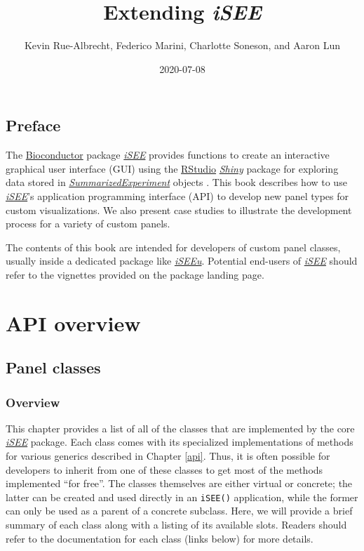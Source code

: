 \documentclass[
]{book}
\title{Extending \emph{iSEE}}
\author{Kevin Rue-Albrecht, Federico Marini, Charlotte Soneson, and Aaron Lun}
\date{2020-07-08}
\begin{document}
\maketitle

{
\setcounter{tocdepth}{1}
\tableofcontents
}
\hypertarget{preface}{%
\chapter*{Preface}\label{preface}}

The \href{https://bioconductor.org/}{Bioconductor} package \emph{\href{https://bioconductor.org/packages/3.11/iSEE}{iSEE}} provides functions to create an interactive graphical user interface (GUI) using the \href{https://rstudio.com/}{RStudio} \emph{\href{https://CRAN.R-project.org/package=Shiny}{Shiny}} package for exploring data stored in \emph{\href{https://bioconductor.org/packages/3.11/SummarizedExperiment}{SummarizedExperiment}} objects \citep{rue2018isee}.
This book describes how to use \emph{\href{https://bioconductor.org/packages/3.11/iSEE}{iSEE}}'s application programming interface (API) to develop new panel types for custom visualizations.
We also present case studies to illustrate the development process for a variety of custom panels.

The contents of this book are intended for developers of custom panel classes, usually inside a dedicated package like \emph{\href{https://bioconductor.org/packages/3.11/iSEEu}{iSEEu}}.
Potential end-users of \emph{\href{https://bioconductor.org/packages/3.11/iSEE}{iSEE}} should refer to the vignettes provided on the package landing page.

\hypertarget{part-api-overview}{%
\part{API overview}\label{part-api-overview}}

\hypertarget{panels}{%
\chapter{Panel classes}\label{panels}}

\hypertarget{overview}{%
\section{Overview}\label{overview}}

This chapter provides a list of all of the classes that are implemented by the core \emph{\href{https://bioconductor.org/packages/3.11/iSEE}{iSEE}} package.
Each class comes with its specialized implementations of methods for various generics described in Chapter \ref{api}.
Thus, it is often possible for developers to inherit from one of these classes to get most of the methods implemented ``for free''.
The classes themselves are either virtual or concrete; the latter can be created and used directly in an \texttt{iSEE()} application, while the former can only be used as a parent of a concrete subclass.
Here, we will provide a brief summary of each class along with a listing of its available slots.
Readers should refer to the documentation for each class (links below) for more details.
\end{document}
